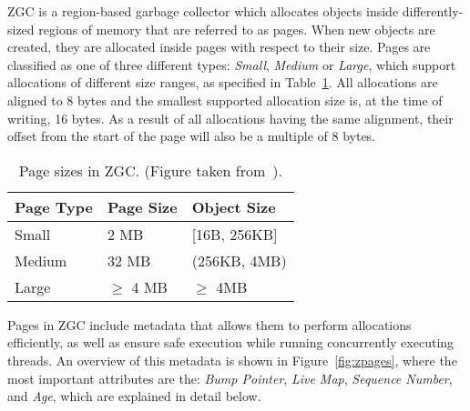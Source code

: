 
ZGC is a region-based garbage collector which allocates objects inside differently-sized regions of memory that are referred to as pages. When new objects are created, they are allocated inside pages with respect to their size. Pages are classified as one of three different types: \textit{Small}, \textit{Medium} or \textit{Large}, which support allocations of different size ranges, as specified in Table~\ref{table:zpage_sizes}. All allocations are aligned to 8 bytes and the smallest supported allocation size is, at the time of writing, 16 bytes. As a result of all allocations having the same alignment, their offset from the start of the page will also be a multiple of 8 bytes.

\begin{table}[H]
    \centering
    \begin{tabular}{lllll}
        Page Type   & Page Size     & \multicolumn{3}{l}{Object Size}      \\ \hline
        Small       & 2 MB          & \multicolumn{3}{l}{{[}16B, 256KB{]}} \\
        Medium      & 32 MB         & \multicolumn{3}{l}{(256KB, 4MB)}     \\
        Large       & $\geq$ 4 MB   & \multicolumn{3}{l}{$\geq$ 4MB}       \\
    \end{tabular}
    \caption{Page sizes in ZGC. (Figure taken from~\cite{zgc:zpage_size_table}). }
    \label{table:zpage_sizes}
\end{table}

Pages in ZGC include metadata that allows them to perform allocations efficiently, as well as ensure safe execution while running concurrently executing threads. An overview of this metadata is shown in Figure~\ref{fig:zpages}, where the most important attributes are the: \textit{Bump Pointer}, \textit{Live Map}, \textit{Sequence Number}, and \textit{Age}, which are explained in detail below.

